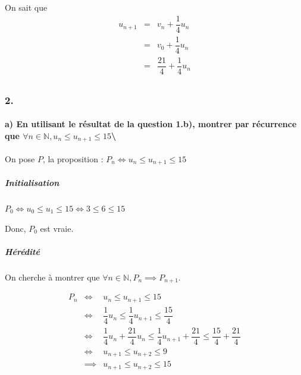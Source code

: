 \documentclass[]{scrartcl}
\let\oldparagraph\paragraph
\renewcommand{\paragraph}[1]{\oldparagraph{#1}\mbox{}}
\let\oldsubparagraph\subparagraph
\renewcommand{\subparagraph}[1]{\oldsubparagraph{#1}\mbox{}}
\begin{document}
On sait que \[
\begin{array}{rcl}
    u_{n+1} &=& v_n + \dfrac{1}{4}u_n\\
            &=& v_0 + \dfrac{1}{4}u_n\\
            &=& \dfrac{21}{4} + \dfrac{1}{4}u_n\\ 
\end{array}
\]

\hypertarget{section-1}{%
\subsubsection{2.}\label{section-1}}

\hypertarget{a-en-utilisant-le-ruxe9sultat-de-la-question-1.b-montrer-par-ruxe9currence-que-forall-ninmathbbn-u_nleq-u_n1leq-15}{%
\paragraph{\texorpdfstring{a) En utilisant le résultat de la question
\textbf{1.b)}, montrer par récurrence que
\(\forall n\in\mathbb{N}, u_n\leq u_{n+1}\leq 15\)\textbackslash{}}{a) En utilisant le résultat de la question 1.b), montrer par récurrence que \textbackslash{}forall n\textbackslash{}in\textbackslash{}mathbb\{N\}, u\_n\textbackslash{}leq u\_\{n+1\}\textbackslash{}leq 15\textbackslash{}}}\label{a-en-utilisant-le-ruxe9sultat-de-la-question-1.b-montrer-par-ruxe9currence-que-forall-ninmathbbn-u_nleq-u_n1leq-15}}

On pose \(P\), la proposition : \(P_n \iff u_n\leq u_{n+1}\leq 15\)

\hypertarget{initialisation}{%
\subparagraph{Initialisation}\label{initialisation}}

\(P_0 \iff u_0 \leq u_1 \leq 15 \iff 3 \leq 6\leq 15\)

Donc, \(P_0\) est vraie.

\hypertarget{huxe9ruxe9dituxe9}{%
\subparagraph{Hérédité}\label{huxe9ruxe9dituxe9}}

On cherche à montrer que
\(\forall n\in\mathbb{N}, P_n\implies P_{n+1}\).

\[
\begin{array}{rcl}
    P_n &\iff& u_n \leq u_{n+1}\leq 15\\[2ex]
        &\iff& \dfrac{1}{4}u_n \leq \dfrac{1}{4}u_{n+1} \leq \dfrac{15}{4}\\[2ex]
        &\iff& \dfrac{1}{4}u_n + \dfrac{21}{4}u_n \leq \dfrac{1}{4}u_{n+1} + \dfrac{21}{4} \leq \dfrac{15}{4} + \dfrac{21}{4}\\[2ex]
        &\iff& u_{n+1} \leq u_{n+2} \leq 9\\[2ex]
        &\implies& u_{n+1} \leq u_{n+2} \leq 15
\end{array}
\]
\end{document}
